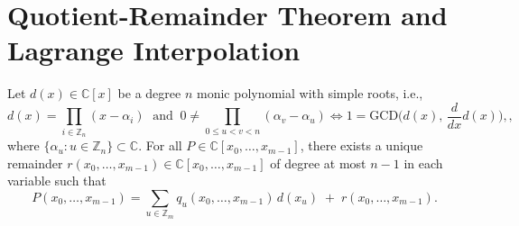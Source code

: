 \section{Quotient-Remainder Theorem and Lagrange Interpolation}\label{sec:QRT}
 \begin{proposition}\label{prop:multivariate-quotient-remainder}
Let $d(x)\in\mathbb{C}[x]$ be a degree $n$ monic polynomial with
simple roots, i.e.,
\begin{equation}
d(x)=\prod_{i\in\mathbb{Z}_{n}}(x-\alpha_{i})\;\text{ and }\:0\ne\prod_{0\le u<v<n}(\alpha_{v}-\alpha_{u})\Longleftrightarrow1=\text{GCD}\big(d(x),\,\frac{d}{dx}d(x)\big),,
\end{equation}
where $\{\alpha_{u}:u\in\mathbb{Z}_{n}\}\subset\mathbb{C}$. 
For
all $P\in\mathbb{C}[x_{0},\ldots,x_{m-1}]$, there exists a unique remainder
$r(x_{0},\ldots,x_{m-1})\in\mathbb{C}[x_{0},\ldots,x_{m-1}]$ of degree
at most $n-1$ in each variable such that 
\begin{equation}
P(x_{0},\ldots,x_{m-1})=\sum_{u\in\mathbb{Z}_{m}}q_{u}(x_{0},\ldots,x_{m-1})\,d(x_{u}) \; + \; r(x_{0},\ldots,x_{m-1}).
\end{equation}
 \end{proposition}
